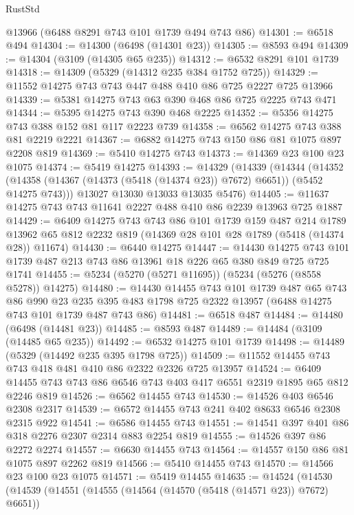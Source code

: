 \begin{lexlean}{RustStd}
\begin{coremodule}
    @13966
    (@6488 @8291 @743 @101 @1739 @494 @743 @86)
@14301 := @6518 @494
@14304 := @14300 (@6498 (@14301 @23))
@14305 := @8593 @494
@14309 := @14304 (@3109 (@14305 @65 @235))
@14312 := @6532 @8291 @101 @1739
@14318 := @14309 (@5329 (@14312 @235 @384 @1752 @725))
@14329 := @11552 @14275 @743 @743 @447 @488 @410 @86 @725 @2227 @725 @13966
@14339 := @5381 @14275 @743 @63 @390 @468 @86 @725 @2225 @743 @471
@14344 := @5395 @14275 @743 @390 @468 @2225
@14352 := @5356 @14275 @743 @388 @152 @81 @117 @2223 @739
@14358 := @6562 @14275 @743 @388 @81 @2219 @2221
@14367 := @6882 @14275 @743 @150 @86 @81 @1075 @897 @2208 @819
@14369 := @5410 @14275 @743
@14373 := @14369 @23 @100 @23 @1075
@14374 := @5419 @14275
@14393 := @14329
    (@14339
      (@14344
        (@14352 (@14358 (@14367 (@14373 (@5418 (@14374 @23)) @7672) @6651)) (@5452 @14275 @743)))
      @13027
      @13030
      @13033
      @13035
      @5476)
@14405 := @11637 @14275 @743 @743 @11641 @2227 @488 @410 @86 @2239 @13963 @725 @1887
@14429 := @6409
    @14275
    @743
    @743
    @86
    @101
    @1739
    @159
    @487
    @214
    @1789
    @13962
    @65
    @812
    @2232
    @819
    (@14369 @28 @101 @28 @1789 (@5418 (@14374 @28)) @11674)
@14430 := @6440 @14275
@14447 := @14430
    @14275
    @743
    @101
    @1739
    @487
    @213
    @743
    @86
    @13961
    @18
    @226
    @65
    @380
    @849
    @725
    @725
    @1741
@14455 := @5234 (@5270 (@5271 @11695)) (@5234 (@5276 (@8558 @5278)) @14275)
@14480 := @14430
    @14455
    @743
    @101
    @1739
    @487
    @65
    @743
    @86
    @990
    @23
    @235
    @395
    @483
    @1798
    @725
    @2322
    @13957
    (@6488 @14275 @743 @101 @1739 @487 @743 @86)
@14481 := @6518 @487
@14484 := @14480 (@6498 (@14481 @23))
@14485 := @8593 @487
@14489 := @14484 (@3109 (@14485 @65 @235))
@14492 := @6532 @14275 @101 @1739
@14498 := @14489 (@5329 (@14492 @235 @395 @1798 @725))
@14509 := @11552 @14455 @743 @743 @418 @481 @410 @86 @2322 @2326 @725 @13957
@14524 := @6409 @14455 @743 @743 @86 @6546 @743 @403 @417 @6551 @2319 @1895 @65 @812 @2246 @819
@14526 := @6562 @14455 @743
@14530 := @14526 @403 @6546 @2308 @2317
@14539 := @6572 @14455 @743 @241 @402 @8633 @6546 @2308 @2315 @922
@14541 := @6586 @14455 @743
@14551 := @14541 @397 @401 @86 @318 @2276 @2307 @2314 @883 @2254 @819
@14555 := @14526 @397 @86 @2272 @2274
@14557 := @6630 @14455 @743
@14564 := @14557 @150 @86 @81 @1075 @897 @2262 @819
@14566 := @5410 @14455 @743
@14570 := @14566 @23 @100 @23 @1075
@14571 := @5419 @14455
@14635 := @14524
    (@14530
      (@14539
        (@14551
          (@14555 (@14564 (@14570 (@5418 (@14571 @23)) @7672) @6651))

\end{coremodule}
\end{lexlean}
